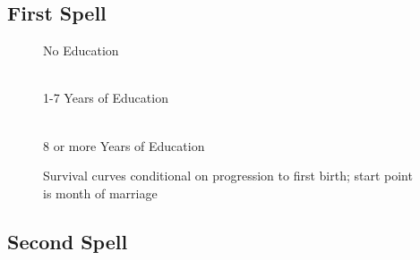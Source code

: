 \documentclass[12pt,letterpaper]{article}
\begin{document}
\setcounter{figure}{0}
\setcounter{table}{0}



\subsection{First Spell}







\begin{figure}[htpb]
\centering
\caption*{No Education}
 \\
\caption*{1-7 Years of Education}
 \\
\caption*{8 or more Years of Education}
\caption{Survival curves conditional on progression to first birth; start point is month of marriage}
\label{fig:results_spell1_pps}
\end{figure}


\clearpage
\newpage

\subsection{Second Spell}






\end{document}
